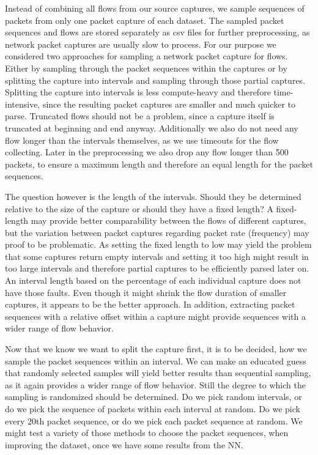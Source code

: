 \documentclass[
	ngerman,
	ruledheaders=section,%
	class=report,%
	thesis={type=bachelor},%
	accentcolor=9c,%
	custommargins=true,%
	marginpar=false,%
	parskip=half-,%
	fontsize=11pt,%
]{tudapub}
\begin{document}
Instead of combining all flows from our source captures, we sample sequences of packets from only one packet capture of each dataset.
The sampled packet sequences and flows are stored separately as csv files for further preprocessing, as network packet captures are usually slow to process.
For our purpose we considered two approaches for sampling a network packet capture for flows.
Either by sampling through the packet sequences within the captures or by splitting the capture into intervals and sampling through those partial captures.
Splitting the capture into intervals is less compute-heavy and therefore time-intensive, since the resulting packet captures are smaller and much quicker to parse.
Truncated flows should not be a problem, since a capture itself is truncated at beginning and end anyway.
Additionally we also do not need any flow longer than the intervals themselves,
as we use timeouts for the flow collecting.
Later in the preprocessing we also drop any flow longer than 500 packets, to ensure a maximum length and therefore an equal length for the packet sequences.

The question however is the length of the intervals.
Should they be determined relative to the size of the capture or should they have a fixed length?
A fixed-length may provide better comparability between the flows of different captures,
but the variation between packet captures regarding packet rate (frequency) may proof to be problematic.
As setting the fixed length to low may yield the problem that some captures return empty intervals
and setting it too high might result in too large intervals and therefore partial captures to be efficiently parsed later on.
An interval length based on the percentage of each individual capture does not have those faults.
Even though it might shrink the flow duration of smaller captures, it appears to be the better approach.
In addition, extracting packet sequences with a relative offset within a capture might provide sequences with a wider range of flow behavior.

Now that we know we want to split the capture first, it is to be decided, how we sample the packet sequences within an interval.
We can make an educated guess that randomly selected samples will yield better results than sequential sampling, as it again provides a wider range of flow behavior.
Still the degree to which the sampling is randomized should be determined.
Do we pick random intervals, or do we pick the sequence of packets within each interval at random.
Do we pick every 20th packet sequence, or do we pick each packet sequence at random.
We might test a variety of those methods to choose the packet sequences, when improving the dataset, once we have some results from the NN.
\end{document}
